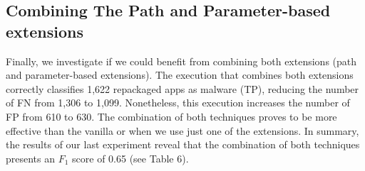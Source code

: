 \begin{table}[ht]
  \caption{Accuracy of the \mas with aid of complementary techniques (3,211 app pairs).}
  \label{tab:accuracyParameter}
\end{table}

\subsection{Combining The Path and Parameter-based extensions} \label{sec:combination}

Finally, we investigate if we could benefit
from combining both extensions (path and parameter-based extensions).
The execution that combines both extensions correctly classifies 1,622 repackaged apps as malware (TP),
reducing the number of FN from 1,306 to 1,099. Nonetheless, this execution increases the number of FP from 610 to 630.
The combination of both techniques proves to be more effective than the vanilla \mas or when we use just one of the extensions.
In summary, the results of our last experiment reveal that the combination of both techniques presents an $F_1$ score of
0.65 (see Table 6).

